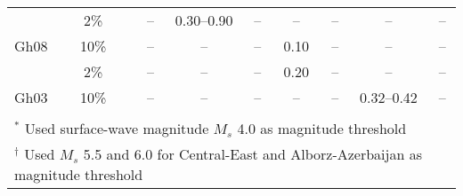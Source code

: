 \begin{table*}[t]
\begin{tabular}{lccccccccc}
            &   2\%  &&   --        & 0.30--0.90  &   --        &   --        &   --        &     --      &     --      \\
    Gh08    &  10\%  &&   --        &   --        &   --        &   0.10      &   --        &     --      &     --      \\
            &   2\%  &&   --        &   --        &   --        &   0.20      &   --        &     --      &     --      \\
    Gh03    &  10\%  &&   --        &   --        &   --        &   --        &   --        & 0.32--0.42  &     --      \\
    \hline                                                                                                              \\[-1.6ex]
    \multicolumn{10}{l}{\small{${}^{*}$ Used surface-wave magnitude $M_s$ 4.0 as magnitude threshold}}                  \\
    \multicolumn{10}{l}{\small{${}^{\dagger}$ Used $M_s$ 5.5 and 6.0 for Central-East and Alborz-Azerbaijan as magnitude threshold}}
\end{tabular}
\label{tab:pga}
\end{table*}
